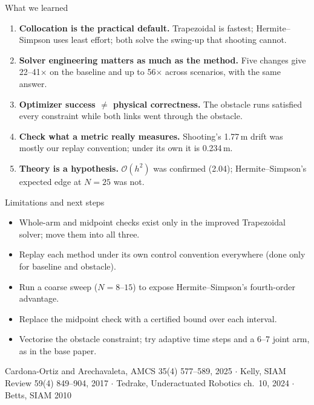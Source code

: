 \documentclass[10pt,aspectratio=169,t]{beamer}
\begin{document}
\begin{frame}{What we learned}
  \vspace{0.8em}
  \begin{enumerate}
    \item \textbf{Collocation is the practical default.} Trapezoidal is fastest; Hermite--Simpson uses least effort;
          both solve the swing-up that shooting cannot.
          \vspace{0.3em}
    \item \textbf{Solver engineering matters as much as the method.} Five changes give 22--41$\times$ on the baseline
          and up to 56$\times$ across scenarios, with the same answer.
          \vspace{0.3em}
    \item \textbf{Optimizer success $\neq$ physical correctness.} The obstacle runs satisfied every constraint while
          both links went through the obstacle.
          \vspace{0.3em}
    \item \textbf{Check what a metric really measures.} Shooting's 1.77\,m drift was mostly our replay convention;
          under its own it is 0.234\,m.
          \vspace{0.3em}
    \item \textbf{Theory is a hypothesis.} $\mathcal{O}(h^2)$ was confirmed (2.04); Hermite--Simpson's expected edge at $N = 25$ was not.
  \end{enumerate}
\end{frame}

\begin{frame}{Limitations and next steps}
  \vspace{0.8em}
  \begin{itemize}
    \item Whole-arm and midpoint checks exist only in the improved Trapezoidal solver; move them into all three.
    \item Replay each method under its own control convention everywhere (done only for baseline and obstacle).
    \item Run a coarse sweep ($N = 8$--$15$) to expose Hermite--Simpson's fourth-order advantage.
    \item Replace the midpoint check with a certified bound over each interval.
    \item Vectorise the obstacle constraint; try adaptive time steps and a 6--7 joint arm, as in the base paper.
  \end{itemize}

  \vspace{1.2em}
  {\footnotesize\color{inkthree}
  Cardona-Ortiz and Arechavaleta, AMCS 35(4) 577--589, 2025 $\cdot$ Kelly, SIAM Review 59(4) 849--904, 2017 $\cdot$
  Tedrake, Underactuated Robotics ch.\ 10, 2024 $\cdot$ Betts, SIAM 2010}
\end{frame}
\end{document}
